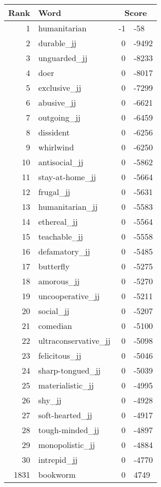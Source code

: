 \begin{longtable}[!htbp]{| rlr@{.}l |}
    \hline
    \textbf{Rank} & \textbf{Word} & \multicolumn{2}{c|}{\textbf{Score}} \\
    \hline
    \endhead
    1 & humanitarian & -1 & -58 \\
    2 & durable\_jj & 0 & -9492 \\
    3 & unguarded\_jj & 0 & -8233 \\
    4 & doer & 0 & -8017 \\
    5 & exclusive\_jj & 0 & -7299 \\
    6 & abusive\_jj & 0 & -6621 \\
    7 & outgoing\_jj & 0 & -6459 \\
    8 & dissident & 0 & -6256 \\
    9 & whirlwind & 0 & -6250 \\
    10 & antisocial\_jj & 0 & -5862 \\
    11 & stay-at-home\_jj & 0 & -5664 \\
    12 & frugal\_jj & 0 & -5631 \\
    13 & humanitarian\_jj & 0 & -5583 \\
    14 & ethereal\_jj & 0 & -5564 \\
    15 & teachable\_jj & 0 & -5558 \\
    16 & defamatory\_jj & 0 & -5485 \\
    17 & butterfly & 0 & -5275 \\
    18 & amorous\_jj & 0 & -5270 \\
    19 & uncooperative\_jj & 0 & -5211 \\
    20 & social\_jj & 0 & -5207 \\
    21 & comedian & 0 & -5100 \\
    22 & ultraconservative\_jj & 0 & -5098 \\
    23 & felicitous\_jj & 0 & -5046 \\
    24 & sharp-tongued\_jj & 0 & -5039 \\
    25 & materialistic\_jj & 0 & -4995 \\
    26 & shy\_jj & 0 & -4928 \\
    27 & soft-hearted\_jj & 0 & -4917 \\
    28 & tough-minded\_jj & 0 & -4897 \\
    29 & monopolistic\_jj & 0 & -4884 \\
    30 & intrepid\_jj & 0 & -4770 \\
    1831 & bookworm & 0 & 4749 \\

\end{longtable}
